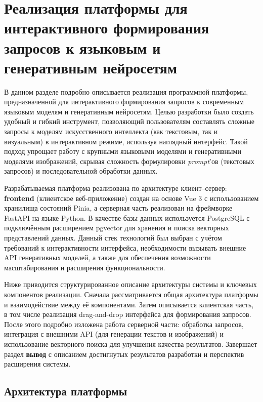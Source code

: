 \section{Реализация платформы для интерактивного формирования запросов к языковым и генеративным нейросетям}

В данном разделе подробно описывается реализация программной платформы, предназначенной для интерактивного формирования запросов к современным языковым моделям и генеративным нейросетям. Целью разработки было создать удобный и гибкий инструмент, позволяющий пользователям составлять сложные запросы к моделям искусственного интеллекта (как текстовым, так и визуальным) в интерактивном режиме, используя наглядный интерфейс. Такой подход упрощает работу с крупными языковыми моделями и генеративными моделями изображений, скрывая сложность формулировки \textit{prompt}'ов \cite{lakera:2025} (текстовых запросов) и последовательной обработки данных.

Разрабатываемая платформа реализована по архитектуре клиент--сервер: \textbf{frontend} (клиентское веб-приложение) создан на основе Vue 3 с использованием хранилища состояний Pinia, а серверная часть реализован на фреймворке FastAPI на языке Python\cite{fastapi:practicum}. В качестве базы данных используется PostgreSQL с подключённым расширением pgvector для хранения и поиска векторных представлений данных. Данный стек технологий был выбран с учётом требований к интерактивности интерфейса, необходимости вызывать внешние API генеративных моделей, а также для обеспечения возможности масштабирования и расширения функциональности.

Ниже приводится структурированное описание архитектуры системы и ключевых компонентов реализации. Сначала рассматривается общая архитектура платформы и взаимодействие между её компонентами. Затем описывается клиентская часть, в том числе реализация drag-and-drop интерфейса для формирования запросов. После этого подробно изложена работа серверной части: обработка запросов, интеграция с внешними API (для генерации текстов и изображений) и использование векторного поиска для улучшения качества результатов. Завершает раздел \textbf{вывод} с описанием достигнутых результатов разработки и перспектив расширения системы.

\subsection{Архитектура платформы}
